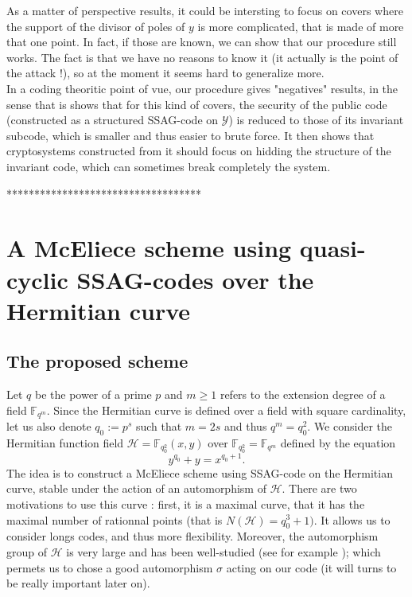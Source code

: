 \documentclass[10pt]{article}
\newcommand{\s}{\vspace{0.3cm}}
\newcommand{\fqm}{\mathbb{F}_{q^m}}
\newcommand{\Y}{\mathcal{Y}}
\begin{document}
As a matter of perspective results, it could be intersting to focus on covers where the support of the divisor of poles of $y$ is more complicated, that is made of more that one point. In fact, if those are known, we can show that our procedure still works. The fact is that we have no reasons to know it (it actually is the point of the attack !), so at the moment it seems hard to generalize more. \\
In a coding theoritic point of vue, our procedure gives "negatives" results, in the sense that is shows that for this kind of covers, the security of the public code (constructed as a structured SSAG-code on $\Y$) is reduced to those of its invariant subcode, which is smaller and thus easier to brute force. It then shows that cryptosystems constructed from it should focus on hidding the structure of the invariant code, which can sometimes break completely the system.

\s

***********************************


\newpage

\section{A McEliece scheme using quasi-cyclic SSAG-codes over the Hermitian curve}

\s

\subsection{The proposed scheme}

\s

Let $q$ be the power of a prime $p$ and $m \geq 1$ refers to the extension degree of a field $\fqm$. Since the Hermitian curve is defined over a field with square cardinality, let us also denote $q_0:=p^s$ such that $m=2s$ and thus $q^m = q_0^2$. We consider the Hermitian function field $\mathcal{H} = \mathbb{F}_{q_0^2}(x,y)$ over $\mathbb{F}_{q_0^2}=\fqm$ defined by the equation
\[y^{q_0}+y=x^{q_0+1}.\]
The idea is to construct a McEliece scheme using SSAG-code on the Hermitian curve, stable under the action of an automorphism of $\mathcal{H}$. There are two motivations to use this curve : first, it is a maximal curve, that it has the maximal number of rationnal points (that is $N(\mathcal{H})=q_0^3+1)$. It allows us to consider longs codes, and thus more flexibility. Moreover, the automorphism group of $\mathcal{H}$ is very large and has been well-studied (see for example \cite{Sti}); which permets us to chose a good automorphism $\sigma$ acting on our code (it will turns to be really important later on). 
\end{document}
